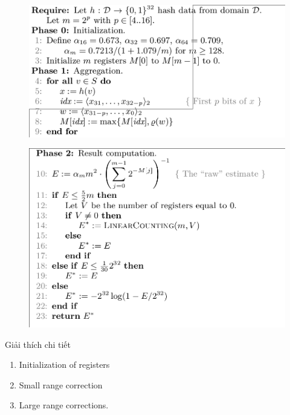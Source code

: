 \documentclass{beamer}
\begin{document}
\begin{frame}
\begin{figure}[H]
\includegraphics[scale=0.3]{HLL1.png}

\end{figure}
\end{frame}
\begin{frame}
\begin{figure}[H]
\includegraphics[scale=0.3]{HLL2.png}
\end{figure}
\end{frame}
\begin{frame}{Giải thích chi tiết}
\begin{enumerate}
\item Initialization of registers
\item Small range correction
\item Large range corrections.
\end{enumerate}
\end{frame}
\end{document}
